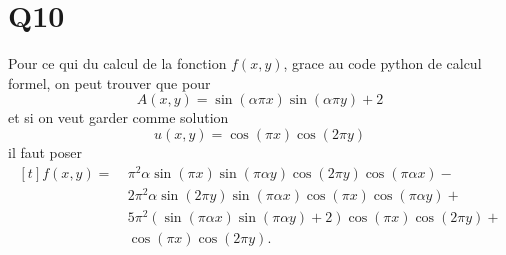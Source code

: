 \documentclass[11pt]{article}
\begin{document}
\section{Q10}

Pour ce qui du calcul de la fonction $f(x,y)$, grace au code python de calcul formel, on peut trouver que pour
\begin{equation}
  A(x,y)= \sin(\alpha \pi x)\sin(\alpha \pi y) + 2
\end{equation}
et si on veut garder comme solution
\begin{equation}
  u(x,y)=\cos(\pi x)\cos(2\pi y)
\end{equation}
il faut poser
\begin{equation}
  \begin{aligned}[t]
    f(x,y) =~& \pi^2 \alpha \sin(\pi x)  \sin(\pi \alpha y)  \cos(2 \pi y)  \cos(\pi \alpha x) - \\
          &2 \pi^2 \alpha \sin(2 \pi y)  \sin(\pi \alpha x)  \cos(\pi x)  \cos(\pi \alpha y) + \\
          &5 \pi^2 (\sin(\pi \alpha x)  \sin(\pi \alpha y) + 2)  \cos(\pi x)  \cos(2 \pi y) + \\
          &\cos(\pi x)  \cos(2 \pi y).
  \end{aligned}
\end{equation}
\end{document}
